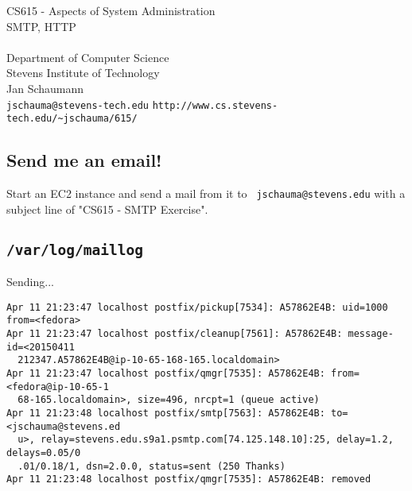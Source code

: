 \documentclass[xga]{xdvislides}
\begin{document}
\setfontphv

\lhead{\slidetitle}                               %
\cfoot{\relax}                               %
\rfoot{\Gray{\today}}

\vspace*{\fill}
\begin{center}
	\Hugesize
		CS615 - Aspects of System Administration\\ [1em]
		SMTP, HTTP \\ [1em]
	\hspace*{5mm}\blueline\\ [1em]
	\Normalsize
		Department of Computer Science\\
		Stevens Institute of Technology\\
		Jan Schaumann\\
		\verb+jschauma@stevens-tech.edu+
		\verb+http://www.cs.stevens-tech.edu/~jschauma/615/+
\end{center}
\vspace*{\fill}

\subsection{Send me an email!}

\vspace*{\fill}
Start an EC2 instance and send a mail from it to {\tt
jschauma@stevens.edu} with a subject line of "CS615 - SMTP Exercise". \\
\vspace*{\fill}

%
%

\subsection{{\tt /var/log/maillog}}
Sending...
\begin{verbatim}
Apr 11 21:23:47 localhost postfix/pickup[7534]: A57862E4B: uid=1000 from=<fedora>
Apr 11 21:23:47 localhost postfix/cleanup[7561]: A57862E4B: message-id=<20150411
  212347.A57862E4B@ip-10-65-168-165.localdomain>
Apr 11 21:23:47 localhost postfix/qmgr[7535]: A57862E4B: from=<fedora@ip-10-65-1
  68-165.localdomain>, size=496, nrcpt=1 (queue active)
Apr 11 21:23:48 localhost postfix/smtp[7563]: A57862E4B: to=<jschauma@stevens.ed
  u>, relay=stevens.edu.s9a1.psmtp.com[74.125.148.10]:25, delay=1.2, delays=0.05/0
  .01/0.18/1, dsn=2.0.0, status=sent (250 Thanks)
Apr 11 21:23:48 localhost postfix/qmgr[7535]: A57862E4B: removed
\end{verbatim}
\end{document}
